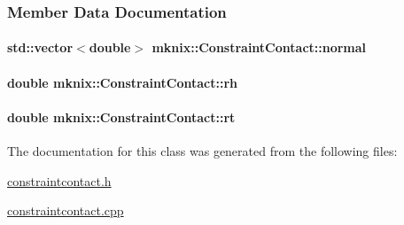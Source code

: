 \subsubsection{Member Data Documentation}
\hypertarget{classmknix_1_1_constraint_contact_a06ba5460d950b98b85226e7b9b520df2}{
\paragraph[{normal}]{\setlength{\rightskip}{0pt plus 5cm}std\-::vector$<$double$>$ mknix\-::\-Constraint\-Contact\-::normal\hspace{0.3cm}{\ttfamily [protected]}}}\label{classmknix_1_1_constraint_contact_a06ba5460d950b98b85226e7b9b520df2}
\hypertarget{classmknix_1_1_constraint_contact_a86b0413ea70c74a38f8610a88cba48c6}{
\paragraph[{rh}]{\setlength{\rightskip}{0pt plus 5cm}double mknix\-::\-Constraint\-Contact\-::rh\hspace{0.3cm}{\ttfamily [protected]}}}\label{classmknix_1_1_constraint_contact_a86b0413ea70c74a38f8610a88cba48c6}
\hypertarget{classmknix_1_1_constraint_contact_a0a2b6bbee4925e12f4921aa58f0f3426}{
\paragraph[{rt}]{\setlength{\rightskip}{0pt plus 5cm}double mknix\-::\-Constraint\-Contact\-::rt\hspace{0.3cm}{\ttfamily [protected]}}}\label{classmknix_1_1_constraint_contact_a0a2b6bbee4925e12f4921aa58f0f3426}


The documentation for this class was generated from the following files\-:\begin{DoxyCompactItemize}
\item 
\hyperlink{constraintcontact_8h}{constraintcontact.\-h}\item 
\hyperlink{constraintcontact_8cpp}{constraintcontact.\-cpp}\end{DoxyCompactItemize}
